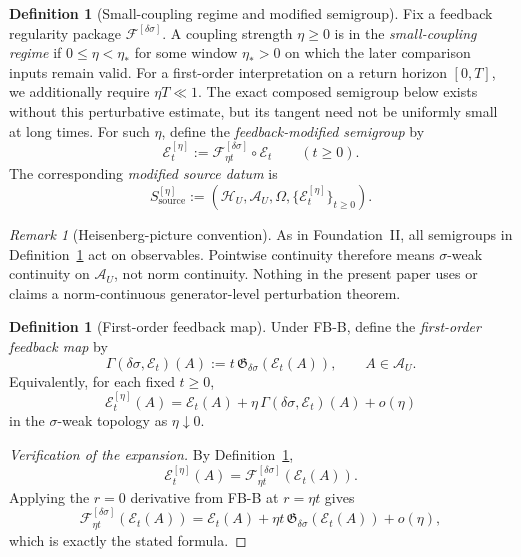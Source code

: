 \documentclass[12pt]{article}
\theoremstyle{definition}
\newtheorem{definition}[theorem]{Definition}
\theoremstyle{remark}
\newtheorem{remark}[theorem]{Remark}
\begin{document}
\begin{definition}[Small-coupling regime and modified semigroup]
\label{def:modified}
Fix a feedback regularity package
\(\mathscr F^{[\delta\sigma]}\). A coupling strength \(\eta\ge0\) is in
the \emph{small-coupling regime} if \(0\le \eta < \eta_*\) for some
window \(\eta_*>0\) on which the later comparison inputs remain valid.
For a first-order interpretation on a return horizon \([0,T]\), we
additionally require \(\eta T\ll1\). The exact composed semigroup below
exists without this perturbative estimate, but its tangent need not be
uniformly small at long times.
For such \(\eta\), define the \emph{feedback-modified semigroup} by
\[
\mathcal E_t^{[\eta]}
:=
\mathscr F_{\eta t}^{[\delta\sigma]}\circ \mathcal E_t
\qquad
(t\ge0).
\]
The corresponding \emph{modified source datum} is
\[
S_{\mathrm{source}}^{[\eta]}
:=
(\mathcal H_U,\mathcal A_U,\Omega,\{\mathcal E_t^{[\eta]}\}_{t\ge0}).
\]
\end{definition}

\begin{remark}[Heisenberg-picture convention]
As in Foundation~II, all semigroups in Definition~\ref{def:modified}
act on observables. Pointwise continuity therefore means
\(\sigma\)-weak continuity on \(\mathcal A_U\), not norm continuity.
Nothing in the present paper uses or claims a norm-continuous
generator-level perturbation theorem.
\end{remark}

\begin{definition}[First-order feedback map]\label{def:Gamma}
Under FB-B, define the \emph{first-order feedback map} by
\[
\Gamma(\delta\sigma,\mathcal E_t)(A)
:=
t\,\mathfrak G_{\delta\sigma}(\mathcal E_t(A)),
\qquad
A\in\mathcal A_U.
\]
Equivalently, for each fixed \(t\ge0\),
\[
\mathcal E_t^{[\eta]}(A)
=
\mathcal E_t(A)
+
\eta\,\Gamma(\delta\sigma,\mathcal E_t)(A)
+
o(\eta)
\]
in the \(\sigma\)-weak topology as \(\eta\downarrow 0\).
\end{definition}

\begin{proof}[Verification of the expansion]
By Definition~\ref{def:modified},
\[
\mathcal E_t^{[\eta]}(A)
=
\mathscr F_{\eta t}^{[\delta\sigma]}(\mathcal E_t(A)).
\]
Applying the \(r=0\) derivative from FB-B at \(r=\eta t\) gives
\[
\mathscr F_{\eta t}^{[\delta\sigma]}(\mathcal E_t(A))
=
\mathcal E_t(A)
+
\eta t\,\mathfrak G_{\delta\sigma}(\mathcal E_t(A))
+
o(\eta),
\]
which is exactly the stated formula.
\end{proof}
\end{document}
